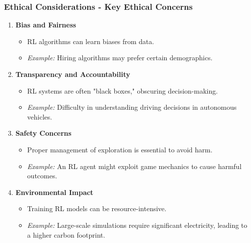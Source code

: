 \documentclass[aspectratio=169]{beamer}
\begin{document}
\begin{frame}[fragile]
    \frametitle{Ethical Considerations - Key Ethical Concerns}
    \begin{enumerate}
        \item \textbf{Bias and Fairness}  
            \begin{itemize}
                \item RL algorithms can learn biases from data.
                \item \textit{Example:} Hiring algorithms may prefer certain demographics.
            \end{itemize}
        
        \item \textbf{Transparency and Accountability}  
            \begin{itemize}
                \item RL systems are often "black boxes," obscuring decision-making.
                \item \textit{Example:} Difficulty in understanding driving decisions in autonomous vehicles.
            \end{itemize}
        
        \item \textbf{Safety Concerns}  
            \begin{itemize}
                \item Proper management of exploration is essential to avoid harm.
                \item \textit{Example:} An RL agent might exploit game mechanics to cause harmful outcomes.
            \end{itemize}
        
        \item \textbf{Environmental Impact}  
            \begin{itemize}
                \item Training RL models can be resource-intensive.
                \item \textit{Example:} Large-scale simulations require significant electricity, leading to a higher carbon footprint.
            \end{itemize}
    \end{enumerate}
\end{frame}
\end{document}
